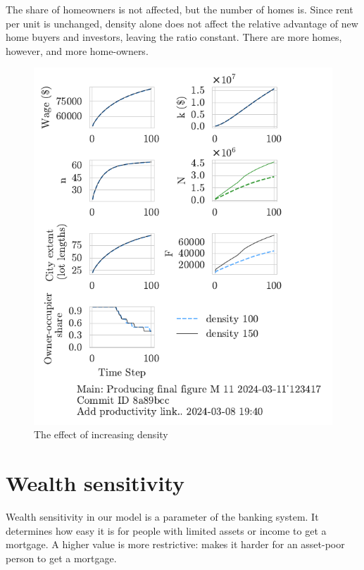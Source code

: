 The share of homeowners is not affected, but the number of homes is. Since rent per unit is unchanged, density alone does not affect the relative advantage of new home buyers and investors, leaving the ratio constant. There are more homes, however, and more home-owners. 

\begin{figure}[h!bt]
    \centering
    \includegraphics[scale=.8, trim={0 1.4cm 0 0},clip]{fig/density-Main-123417.pdf}
    \caption{The effect of increasing density}
    \label{fig:density_ownership_trajectory}
\end{figure}


\newpage

\section{Wealth sensitivity}
Wealth sensitivity in our model is a parameter of the banking system. It determines how easy it is for people with limited assets or income to get a mortgage. A higher value is more restrictive:  makes it harder for an asset-poor person to get a mortgage.


